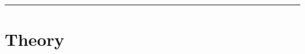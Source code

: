 \documentclass[a4paper,12pt]{article}
\begin{document}
\justifying

\color{color-3}

\tableofcontents

\vspace{4pt}
\noindent\rule[0.5ex]{\linewidth}{1pt}
\color{black}

\vspace{-1cm}



\section{Theory} %

\end{document}
